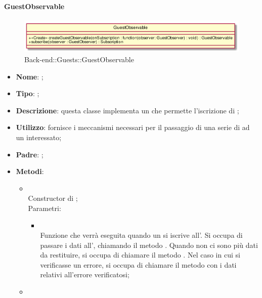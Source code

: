 \FloatBarrier

\hypertarget{GuestObservable_label}{\paragraph{GuestObservable}}
\begin{figure}[h]
	\centering
	\includegraphics[width=\textwidth,height=\textheight,keepaspectratio]{images/ClassGuestObservable.png}
	\caption{Back-end::Guests::GuestObservable}
\end{figure}
\begin{itemize}
	\item \textbf{Nome}: ;
	\item \textbf{Tipo}: ;
	\item \textbf{Descrizione}: questa classe implementa un  che permette l'iscrizione di ;
	\item \textbf{Utilizzo}: fornisce i meccanismi necessari per il passaggio di una serie di  ad un  interessato;
	\item \textbf{Padre}: ;
	\item \textbf{Metodi}:
	\begin{itemize}
		\item[]  \\
		Constructor di ;\\
		Parametri:
		\begin{itemize}
			\item {} \\
			Funzione che verrà eseguita quando un  si iscrive all'. Si occupa di passare i dati all', chiamando il metodo . Quando non ci sono più dati da restituire, si occupa di chiamare il metodo . Nel caso in cui si verificasse un errore, si occupa di chiamare il metodo  con i dati relativi all'errore verificatosi;
		\end{itemize}
		\item[]  \\

\end{itemize}
\end{itemize}
